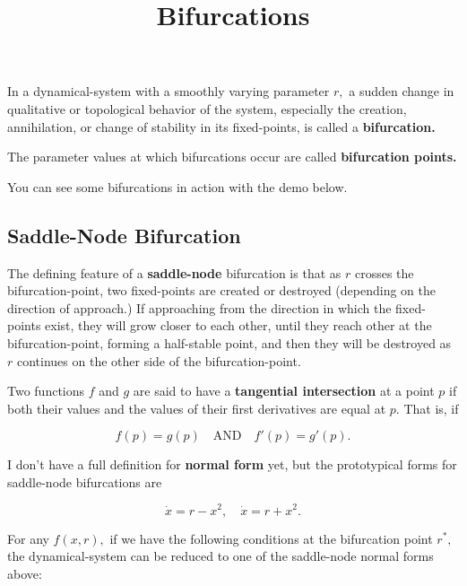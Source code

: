 \documentclass{article}
\title{Bifurcations}
\begin{document}
\begin{definition}[bifurcation]
In a \@{dynamical-system} with a smoothly varying \@{parameter} $r,$ a sudden change in qualitative or topological behavior of the system, especially the creation, annihilation, or change of stability in its \@{fixed-points}, is called a \textbf{bifurcation.}
\end{definition}

\begin{definition}
The parameter values at which \@{bifurcations} occur are called \textbf{bifurcation points.}
\end{definition}

You can see some \@{bifurcations} in action with the demo below.


\subsection{Saddle-Node Bifurcation}

\begin{definition}
The defining feature of a \textbf{saddle-node} \@{bifurcation} is that as $r$ crosses the \@{bifurcation-point}, two \@{fixed-points} are created or destroyed (depending on the direction of approach.) If approaching from the direction in which the \@{fixed-points} exist, they will grow closer to each other, until they reach other at the \@{bifurcation-point}, forming a \@{half-stable} point, and then they will be destroyed as $r$ continues on the other side of the \@{bifurcation-point}.
\end{definition}

\begin{definition}
Two \@{functions} $f$ and $g$ are said to have a \textbf{tangential intersection} at a \@{point} $p$ if both their \@{values} and the \@{values} of their first \@{derivatives} are equal at $p.$ That is, if

\[ f(p) = g(p) \quad \text{AND} \quad f'(p) = g'(p). \]
\end{definition}

I don't have a full definition for \textbf{normal form} yet, but the prototypical forms for \@{saddle-node} \@{bifurcations} are

\[ \dot{x} = r - x^2, \quad \dot{x} = r + x^2. \]

For any $f(x, r),$ if we have the following conditions at the \@{bifurcation} point $r^*,$ the \@{dynamical-system} can be reduced to one of the \@{saddle-node} normal forms above:
\end{document}
